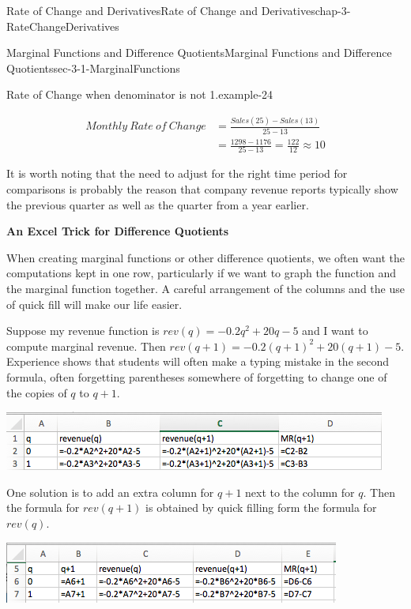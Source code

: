 \documentclass[oneside,10pt,]{book}
\newcommand{\terminology}[1]{\textbf{#1}}
\numberwithin{equation}{section}
\newcommand{\amp}{&}
\begin{document}
\begin{chapterptx}{Rate of Change and Derivatives}{}{Rate of Change and Derivatives}{}{}{chap-3-RateChangeDerivatives}
\begin{sectionptx}{Marginal Functions and Difference Quotients}{}{Marginal Functions and Difference Quotients}{}{}{sec-3-1-MarginalFunctions}
\begin{example}{Rate of Change when denominator is not 1.}{example-24}
\par
\hypertarget{p-936}{}%
%
\begin{equation*}
\begin{aligned} Monthly\ Rate\ of\ Change \amp = \frac{Sales(25)-Sales(13)}{25-13} \\ 
\amp = \frac{1298-1176}{25-13}=\frac{122}{12}\approx 10 \end{aligned}
\end{equation*}
%
\end{example}
\hypertarget{p-937}{}%
It is worth noting that the need to adjust for the right time period for comparisons is probably the reason that company revenue reports typically show the previous quarter as well as the quarter from a year earlier.%
\par
\hypertarget{p-938}{}%
\terminology{An Excel Trick for Difference Quotients}%
\par
\hypertarget{p-939}{}%
When creating marginal functions or other difference quotients, we often want the computations kept in one row, particularly if we want to graph the function and the marginal function together.  A careful arrangement of the columns and the use of quick fill will make our life easier.%
\par
\hypertarget{p-940}{}%
Suppose my revenue function is \(rev(q)=-0.2q^2+20q-5\) and I want to compute marginal revenue.  Then \(rev(q+1)=-0.2(q+1)^2+20(q+1)-5\).  Experience shows that students will often make a typing mistake in the second formula, often forgetting parentheses somewhere of forgetting to change one of the copies of \(q\) to \(q+1\).%
\begin{sidebyside}{1}{0.1}{0.1}{0}%
\begin{sbspanel}{0.8}%
\includegraphics[width=1\linewidth]{images/sec3-1-12.png}
\end{sbspanel}%
\end{sidebyside}%
\par
\hypertarget{p-941}{}%
One solution is to add an extra column for \(q+1\) next to the column for \(q\).  Then the formula for \(rev(q+1)\) is obtained by quick filling form the formula for \(rev(q)\).%
\begin{sidebyside}{1}{0.1}{0.1}{0}%
\begin{sbspanel}{0.8}%
\includegraphics[width=1\linewidth]{images/sec3-1-13.png}

\end{sbspanel}
\end{sidebyside}
\end{sectionptx}
\end{chapterptx}
\end{document}
